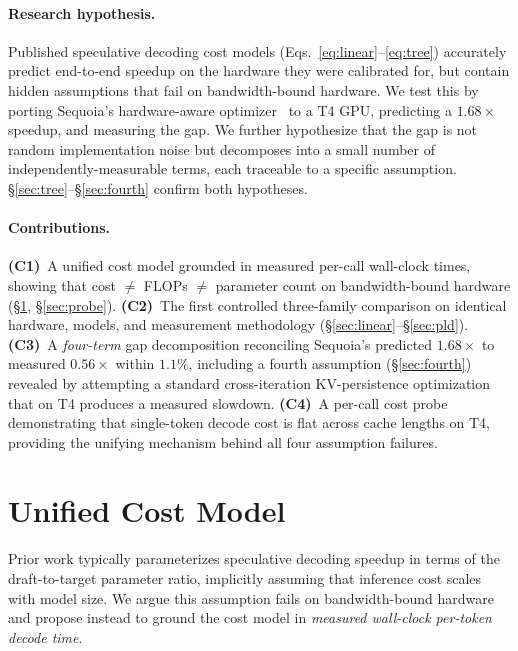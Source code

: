 \documentclass[letterpaper,twocolumn,10pt]{article}
\begin{document}
\paragraph{Research hypothesis.}
Published speculative decoding cost models (Eqs.~\ref{eq:linear}--\ref{eq:tree}) accurately predict end-to-end speedup on the hardware they were calibrated for, but contain hidden assumptions that fail on bandwidth-bound hardware.
We test this by porting Sequoia's hardware-aware optimizer~\cite{chen2024sequoia} to a T4 GPU, predicting a $1.68\times$ speedup, and measuring the gap.
We further hypothesize that the gap is not random implementation noise but decomposes into a small number of independently-measurable terms, each traceable to a specific assumption.
\S\ref{sec:tree}--\S\ref{sec:fourth} confirm both hypotheses.

\paragraph{Contributions.}
\textbf{(C1)}~A unified cost model grounded in measured per-call wall-clock times, showing that cost $\neq$ FLOPs $\neq$ parameter count on bandwidth-bound hardware (\S\ref{sec:cost}, \S\ref{sec:probe}).
\textbf{(C2)}~The first controlled three-family comparison on identical hardware, models, and measurement methodology (\S\ref{sec:linear}--\S\ref{sec:pld}).
\textbf{(C3)}~A \emph{four-term} gap decomposition reconciling Sequoia's predicted $1.68\times$ to measured $0.56\times$ within $1.1\%$, including a fourth assumption (\S\ref{sec:fourth}) revealed by attempting a standard cross-iteration KV-persistence optimization that on T4 produces a measured slowdown.
\textbf{(C4)}~A per-call cost probe demonstrating that single-token decode cost is flat across cache lengths on T4, providing the unifying mechanism behind all four assumption failures.


\section{Unified Cost Model}
\label{sec:cost}

Prior work typically parameterizes speculative decoding speedup in terms of the draft-to-target parameter ratio, implicitly assuming that inference cost scales with model size.
We argue this assumption fails on bandwidth-bound hardware and propose instead to ground the cost model in \emph{measured wall-clock per-token decode time}.
\end{document}
